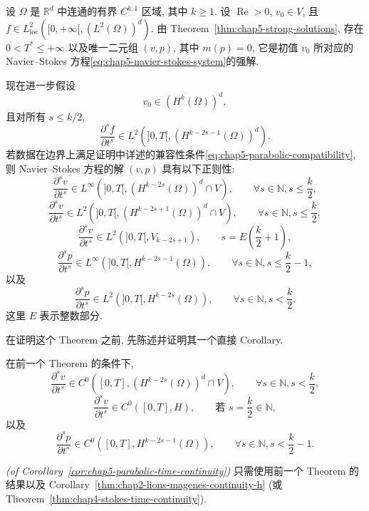 \begin{Theorem}
\label{thm:chap5-parabolic-regularity}
设 $\Omega$ 是 $\mathbb R^d$ 中连通的有界 $C^{k,1}$ 区域, 其中 $k\geq1$. 设 $\operatorname{Re}>0$, $v_0\in V$, 且 $f\in L_{\mathrm{loc}}^2([0,+\infty[,(L^2(\Omega))^d)$. 由 Theorem~\ref{thm:chap5-strong-solutions}, 存在 $0<T^*\leq+\infty$ 以及唯一二元组 $(v,p)$, 其中 $m(p)=0$, 它是初值 $v_0$ 所对应的 Navier--Stokes 方程\eqref{eq:chap5-navier-stokes-system}的强解.

现在进一步假设
\[
 v_0\in(H^k(\Omega))^d,
\]
且对所有 $s\leq k/2$,
\[
 \frac{\partial^sf}{\partial t^s}
 \in L^2(]0,T[,(H^{k-2s-1}(\Omega))^d).
\]
若数据在边界上满足证明中详述的兼容性条件\eqref{eq:chap5-parabolic-compatibility}, 则 Navier--Stokes 方程的解 $(v,p)$ 具有以下正则性:
\[
 \frac{\partial^sv}{\partial t^s}
 \in L^\infty(]0,T[,(H^{k-2s}(\Omega))^d\cap V),
 \qquad\forall s\in\mathbb N, s\leq\frac k2,
\]
\[
 \frac{\partial^sv}{\partial t^s}
 \in L^2(]0,T[,(H^{k-2s+1}(\Omega))^d\cap V),
 \qquad\forall s\in\mathbb N, s\leq\frac k2,
\]
\[
 \frac{\partial^sv}{\partial t^s}
 \in L^2(]0,T[,V_{k-2s+1}),
 \qquad s=E\!\left(\frac k2+1\right),
\]
\[
 \frac{\partial^sp}{\partial t^s}
 \in L^\infty(]0,T[,H^{k-2s-1}(\Omega)),
 \qquad\forall s\in\mathbb N, s\leq\frac k2-1,
\]
以及
\[
 \frac{\partial^sp}{\partial t^s}
 \in L^2(]0,T[,H^{k-2s}(\Omega)),
 \qquad\forall s\in\mathbb N, s<\frac k2.
\]
这里 $E$ 表示整数部分.
\end{Theorem}

在证明这个 Theorem 之前, 先陈述并证明其一个直接 Corollary.

\begin{Corollary}
\label{cor:chap5-parabolic-time-continuity}
在前一个 Theorem 的条件下,
\[
 \frac{\partial^sv}{\partial t^s}
 \in C^0([0,T],(H^{k-2s}(\Omega))^d\cap V),
 \qquad\forall s\in\mathbb N, s<\frac k2,
\]
\[
 \frac{\partial^sv}{\partial t^s}\in C^0([0,T],H),
 \qquad\text{若 }s=\frac k2\in\mathbb N,
\]
以及
\[
 \frac{\partial^sp}{\partial t^s}
 \in C^0([0,T],H^{k-2s-1}(\Omega)),
 \qquad\forall s\in\mathbb N, s<\frac k2-1.
\]
\end{Corollary}

\begin{Proof}
\textit{(of Corollary~\ref{cor:chap5-parabolic-time-continuity})}\quad
只需使用前一个 Theorem 的结果以及 Corollary~\ref{thm:chap2-lions-magenes-continuity-h} (或 Theorem~\ref{thm:chap4-stokes-time-continuity}).
\end{Proof}

